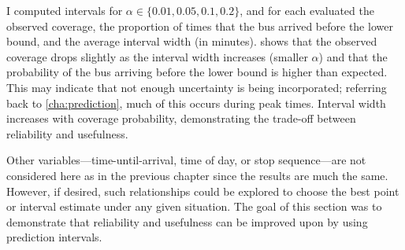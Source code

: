 I computed intervals for $\alpha \in \{0.01, 0.05, 0.1, 0.2\}$, and for each evaluated the observed coverage, the proportion of times that the bus arrived before the lower bound, and the average interval width (in minutes).  shows that the observed coverage drops slightly as the interval width increases (smaller $\alpha$) and that the probability of the bus arriving before the lower bound is higher than expected. This may indicate that not enough uncertainty is being incorporated; referring back to \cref{cha:prediction}, much of this occurs during peak times. Interval width increases with coverage probability, demonstrating the trade-off between reliability and usefulness.


Other variables---time-until-arrival, time of day, or stop sequence---are not considered here as in the previous chapter since the results are much the same. However, if desired, such relationships could be explored to choose the best point or interval estimate under any given situation. The goal of this section was to demonstrate that reliability and usefulness can be improved upon by using prediction intervals.
